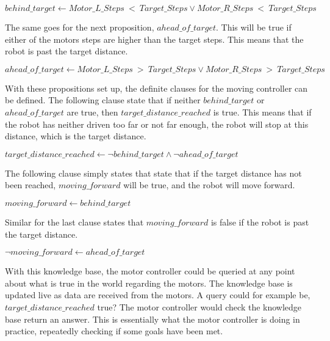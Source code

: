 \hspace{3mm} $behind\_target \leftarrow Motor\_L\_Steps~<~Target\_Steps \lor Motor\_R\_Steps~<~Target\_Steps$

The same goes for the next proposition, $ahead\_of\_target$. This will be true if either of the motors steps are higher than the target steps. This means that the robot is past the target distance.

\hspace{3mm} $ahead\_of\_target \leftarrow Motor\_L\_Steps~>~Target\_Steps \lor Motor\_R\_Steps~>~Target\_Steps$

With these propositions set up, the definite clauses for the moving controller can be defined. The following clause state that if neither $behind\_target$ or $ahead\_of\_target$ are true, then $target\_distance\_reached$ is true. This means that if the robot has neither driven too far or not far enough, the robot will stop at this distance, which is the target distance.

\hspace{3mm} $target\_distance\_reached \leftarrow \lnot behind\_target \land \lnot ahead\_of\_target$

The following clause simply states that state that if the target distance has not been reached, $moving\_forward$ will be true, and the robot will move forward.

\hspace{3mm} $moving\_forward \leftarrow behind\_target$

Similar for the last clause states that $moving\_forward$ is false if the robot is past the target distance.

\hspace{3mm} $\lnot moving\_forward \leftarrow ahead\_of\_target$

With this knowledge base, the motor controller could be queried at any point about what is true in the world regarding the motors. The knowledge base is updated live as data are received from the motors. A query could for example be, $target\_distance\_reached$ true? The motor controller would check the knowledge base return an answer. This is essentially what the motor controller is doing in practice, repeatedly checking if some goals have been met.

